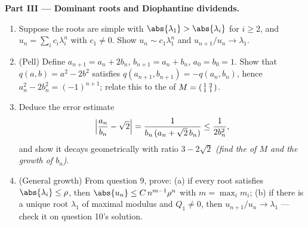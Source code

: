 \begin{problem}
\medskip
\noindent\textbf{Part III --- Dominant roots and Diophantine
dividends.}
\begin{enumerate}[resume]
  \item Suppose the roots are simple with $\abs{\lambda_1} >
        \abs{\lambda_i}$ for $i \geq 2$, and $u_n = \sum_i c_i
        \lambda_i^n$ with $c_1 \neq 0$. Show $u_n \sim
        c_1\lambda_1^n$ and $u_{n+1}/u_n \to \lambda_1$.
  \item (Pell) Define $a_{n+1} = a_n + 2b_n$, $b_{n+1} = a_n +
        b_n$, $a_0 = b_0 = 1$. Show that $q(a, b) = a^2 - 2b^2$
        satisfies $q(a_{n+1}, b_{n+1}) = -q(a_n, b_n)$, hence
        $a_n^2 - 2b_n^2 = (-1)^{n+1}$; relate this to the
         of $M = \begin{psmallmatrix}1 & 2\\ 1 &
        1\end{psmallmatrix}$.
  \item Deduce the error estimate
        \[
        \Bigl|\frac{a_n}{b_n} - \sqrt2\Bigr|
        = \frac{1}{b_n\,(a_n + \sqrt2\,b_n)}
        \leq \frac{1}{2b_n^2},
        \]
        and show it decays geometrically with ratio $3 -
        2\sqrt2$ \emph{(find the  of $M$ and the
        growth of $b_n$)}.
  \item (General growth) From question 9, prove: (a) if every
        root satisfies $\abs{\lambda_i} \leq \rho$, then
        $\abs{u_n} \leq C\,n^{m-1}\rho^n$ with $m = \max_i m_i$;
        (b) if there is a unique root $\lambda_1$ of maximal
        modulus and $Q_1 \neq 0$, then $u_{n+1}/u_n \to
        \lambda_1$ --- check it on question 10's solution.
\end{enumerate}


\end{problem}
